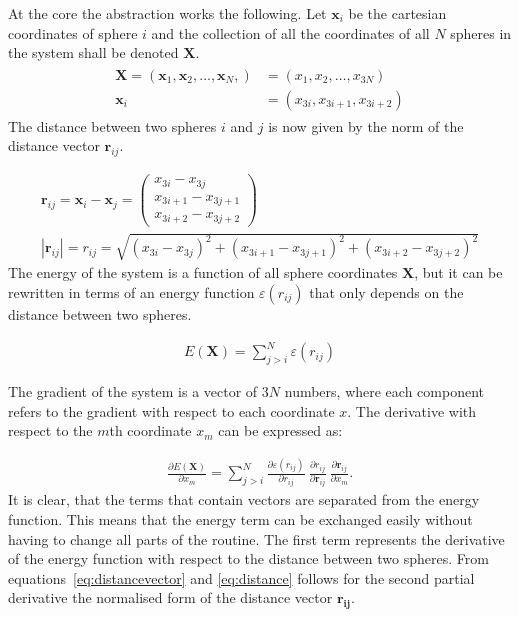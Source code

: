 At the core the abstraction works the following. Let $\mathbf{x}_i$ be the
cartesian coordinates of sphere $i$ and the collection of all the coordinates
of all $N$ spheres in the system shall be denoted $\mathbf{X}$.
%
\begin{align}
    \begin{aligned}
        \mathbf{X}=(\mathbf{x}_1,\mathbf{x}_2,\ldots,\mathbf{x}_N,)&=(x_1,x_2,\ldots,x_{3N}) \\
            \mathbf{x}_i &= (x_{3i},x_{3i+1},x_{3i+2})
    \end{aligned}
\end{align}%
%
The distance between two spheres $i$ and $j$ is now given by the norm of the
distance vector $\mathbf{r}_{ij}$.

\begin{align}
    \mathbf{r}_{ij}=\mathbf{x}_i-\mathbf{x}_j=
    \begin{pmatrix}
        x_{3i} - x_{3j}\\
        x_{3i+1} - x_{3j+1}\\
        x_{3i+2} - x_{3j+2}
    \end{pmatrix}\label{eq:distancevector}\\
    |\mathbf{r}_{ij}|=r_{ij}=\sqrt{(x_{3i} - x_{3j})^2 + (x_{3i+1} - x_{3j+1})^2 + (x_{3i+2} - x_{3j+2})^2}\label{eq:distance}
\end{align}
%
The energy of the system is a function of all sphere coordinates $\mathbf{X}$,
but it can be rewritten in terms of an energy function $\varepsilon(r_{ij})$ that only depends on the
distance between two spheres.

\begin{align}
    E(\mathbf{X})=\sum_{j>i}^N\varepsilon(r_{ij})
\end{align}%
%

The gradient of the system is a vector of $3N$ numbers, where each component
refers to the gradient with respect to each coordinate $x$. The derivative with
respect to the $m$th coordinate $x_m$ can be expressed as:

\begin{align}
    \frac{\partial E(\mathbf{X})}{\partial x_m}=\sum_{j>i}^N\frac{\partial\varepsilon(r_{ij})}{\partial r_{ij}}\ \frac{\partial r_{ij}}{\partial\mathbf{r}_{ij}}\ \frac{\partial\mathbf{r}_{ij}}{\partial x_m}.\label{eq:gradientcomponent}
\end{align}%
%
It is clear, that the terms that contain vectors are separated from the energy
function. This means that the energy term can be exchanged easily without
having to change all parts of the routine. The first term represents the
derivative of the energy function with respect to the distance between two
spheres. From equations~\eqref{eq:distancevector} and \eqref{eq:distance}
follows for the second partial derivative the normalised form of the distance
vector $\mathbf{r_{ij}}$.

